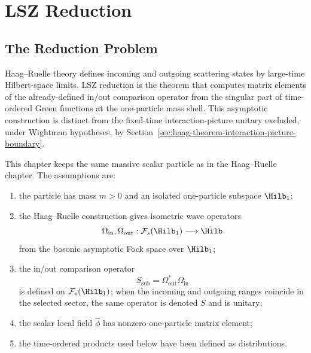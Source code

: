 \chapter{LSZ Reduction}
\label{ch:lsz-reduction}
\ConventionsLorentzian


\section{The Reduction Problem}

Haag--Ruelle theory defines incoming and outgoing scattering states by
large-time Hilbert-space limits. LSZ reduction is the theorem that computes
matrix elements of the already-defined in/out comparison operator from the
singular part of time-ordered Green functions at the one-particle mass shell.
This asymptotic construction is distinct from the fixed-time interaction-picture
unitary excluded, under Wightman hypotheses, by
Section~\ref{sec:haag-theorem-interaction-picture-boundary}.

\begin{definition}
\label{def:massive-scalar-lsz-datum}
This chapter keeps the same massive scalar particle as in the Haag--Ruelle
chapter. The assumptions are:
\begin{enumerate}
  \item the particle has mass \(m>0\) and an isolated one-particle subspace
  \(\Hilb_1\);
  \item the Haag--Ruelle construction gives isometric wave operators
  \[
    \Omega_{\mathrm{in}},\Omega_{\mathrm{out}}:
    \mathcal F_s(\Hilb_1)\longrightarrow\Hilb
  \]
  from the bosonic asymptotic Fock space over \(\Hilb_1\);
  \item the in/out comparison operator
  \[
    S_{\mathrm{sub}}=\Omega_{\mathrm{out}}^*\Omega_{\mathrm{in}}
  \]
  is defined on \(\mathcal F_s(\Hilb_1)\); when the incoming and outgoing
  ranges coincide in the selected sector, the same operator is denoted \(S\)
  and is unitary;
  \item the scalar local field \(\widehat\phi\) has nonzero one-particle
  matrix element;
  \item the time-ordered products used below have been defined as
  distributions.
\end{enumerate}
\end{definition}

